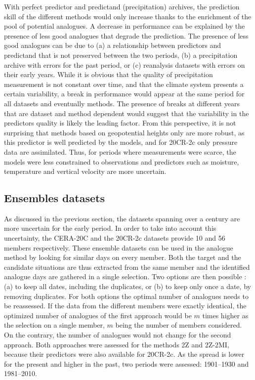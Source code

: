 \documentclass{ametsoc}
\begin{document}
With perfect predictor and predictand (precipitation) archives, the prediction skill of the different methods would only increase thanks to the enrichment of the pool of potential analogues. A decrease in performance can be explained by the presence of less good analogues that degrade the prediction. The presence of less good analogues can be due to (a) a relationship between predictors and predictand that is not preserved between the two periods, (b) a precipitation archive with errors for the past period, or (c) reanalysis datasets with errors on their early years. While it is obvious that the quality of precipitation measurement is not constant over time, and that the climate system presents a certain variability, a break in performance would appear at the same period for all datasets and eventually methods. The presence of breaks at different years that are dataset and method dependent would suggest that the variability in the predictors quality is likely the leading factor. From this perspective, it is not surprising that methods based on geopotential heights only are more robust, as this predictor is well predicted by the models, and for 20CR-2c only pressure data are assimilated. Thus, for periods where measurements were scarce, the models were less constrained to observations and predictors such as moisture, temperature and vertical velocity are more uncertain. 


\subsection{Ensembles datasets}

As discussed in the previous section, the datasets spanning over a century are more uncertain for the early period. In order to take into account this uncertainty, the CERA-20C and the 20CR-2c datasets provide 10 and 56 members respectively. These ensemble datasets can be used in the analogue method by looking for similar days on every member. Both the target and the candidate situations are thus extracted from the same member and the identified analogue days are gathered in a single selection. Two options are then possible : (a) to keep all dates, including the duplicates, or (b) to keep only once a date, by removing duplicates. For both options the optimal number of analogues needs to be reassessed. If the data from the different members were exactly identical, the optimized number of analogues of the first approach would be $m$ times higher as the selection on a single member, $m$ being the number of members considered. On the contrary, the number of analogues would not change for the second approach. Both approaches were assessed for the methods 2Z and 2Z-2MI, because their predictors were also available for 20CR-2c. As the spread is lower for the present and higher in the past, two periods were assessed: 1901--1930 and 1981--2010.
\end{document}
